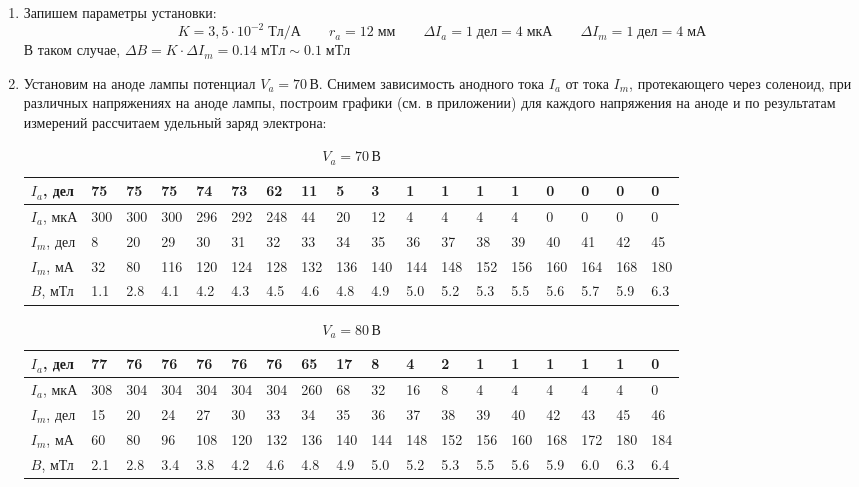 \documentclass[a4paper,12pt]{article}
\begin{document}
	\begin{enumerate}

		\item Запишем параметры установки:
		$$K = 3,5 \cdot 10^{-2} \; Тл/А \qquad r_a = 12\;мм \qquad \Delta I_a = 1\;дел = 4\;мкА \qquad \Delta I_m = 1\;дел = 4\;мА$$
		В таком случае, $\Delta B = K \cdot \Delta I_m = 0.14\;мТл \sim 0.1\;мТл$

		\item Установим на аноде лампы потенциал $V_a = 70 \, В$. Снимем зависимость анодного тока $I_a$ от тока $I_m$, 
		протекающего через соленоид, при различных напряжениях на аноде лампы, построим графики (см. в приложении) для каждого 
		напряжения на аноде и по результатам измерений рассчитаем удельный заряд электрона:
		\begin{table}[h!]
			\caption{$V_a = 70 \, В$}
			\begin{center}
				\begin{tabular}{|*{18}{l|}} \hline
					$I_a$, дел & 75 & 75 & 75 &	74 & 73 & 62 & 11 & 5 & 3 & 1 & 1 & 1 & 1 & 0 & 0 & 0 & 0 \\ \hline
					$I_a$, мкА & 300 & 300 & 300 & 296 & 292 & 248 & 44 & 20 & 12 & 4 & 4 & 4 & 4 & 0 & 0 & 0 & 0 \\ \hline
					$I_m$, дел & 8 & 20 & 29 &	30 & 31 & 32 & 33 & 34 & 35 & 36 & 37 & 38 & 39 & 40 & 41 & 42 & 45 \\ \hline
					$I_m$, мА & 32 & 80 & 116 & 120 & 124 & 128 & 132 & 136 & 140 & 144 & 148 & 152 & 156 & 160 & 164 & 168 & 180 \\ \hline
					$B$, мТл& 1.1 & 2.8 & 4.1 & 4.2 & 4.3 & 4.5 & 4.6 & 4.8 & 4.9 & 5.0 & 5.2 & 5.3 & 5.5 & 5.6 & 5.7 & 5.9 & 6.3 \\ \hline	
				\end{tabular}	
			\end{center}
		\end{table}

		\begin{table}[h!]
			\caption{$V_a = 80 \, В$}
			\begin{center}
				\begin{tabular}{|*{18}{l|}} \hline
					$I_a$, дел & 77 & 76 & 76 &	76 & 76 & 76 & 65 & 17 & 8 & 4 & 2 & 1 & 1 & 1 & 1 & 1 & 0 \\ \hline
					$I_a$, мкА & 308 & 304 & 304 & 304 & 304 & 304 & 260 & 68 & 32 & 16 & 8 & 4 & 4 & 4 & 4 & 4 & 0 \\ \hline
					$I_m$, дел & 15 & 20 & 24 &	27 & 30 & 33 & 34 & 35 & 36 & 37 & 38 & 39 & 40 & 42 & 43 & 45 & 46 \\ \hline
					$I_m$, мА & 60 & 80 & 96 & 108 & 120 & 132 & 136 & 140 & 144 & 148 & 152 & 156 & 160 & 168 & 172 & 180 & 184 \\ \hline
					$B$, мТл & 2.1 & 2.8 & 3.4 & 3.8 & 4.2 & 4.6 & 4.8 & 4.9 & 5.0 & 5.2 & 5.3 & 5.5 & 5.6 & 5.9 & 6.0 & 6.3 & 6.4 \\ \hline
				\end{tabular}	
			\end{center}
		\end{table}
		

\end{enumerate}
\end{document}
